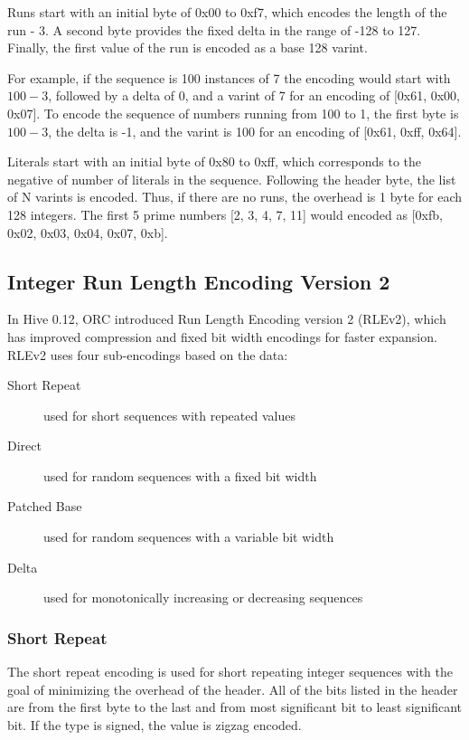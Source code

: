 \documentclass{article}
\begin{document}
Runs start with an initial byte of 0x00 to 0xf7, which encodes the
length of the run - 3. A second byte provides the fixed delta in the
range of -128 to 127. Finally, the first value of the run is encoded
as a base 128 varint.

For example, if the sequence is 100 instances of 7 the encoding would
start with $100 - 3$, followed by a delta of 0, and a varint of 7 for
an encoding of [0x61, 0x00, 0x07]. To encode the sequence of numbers
running from 100 to 1, the first byte is $100 - 3$, the delta is -1,
and the varint is 100 for an encoding of [0x61, 0xff, 0x64].

Literals start with an initial byte of 0x80 to 0xff, which corresponds
to the negative of number of literals in the sequence. Following the
header byte, the list of N varints is encoded.  Thus, if there are
no runs, the overhead is 1 byte for each 128 integers. The first 5
prime numbers [2, 3, 4, 7, 11] would encoded as [0xfb, 0x02, 0x03,
0x04, 0x07, 0xb].

\subsection{Integer Run Length Encoding Version 2}

In Hive 0.12, ORC introduced Run Length Encoding version 2 (RLEv2),
which has improved compression and fixed bit width encodings for
faster expansion. RLEv2 uses four sub-encodings based on the data:

\begin{description}
\item[Short Repeat] used for short sequences with repeated values
\item[Direct] used for random sequences with a fixed bit width
\item[Patched Base] used for random sequences with a variable bit width
\item[Delta] used for monotonically increasing or decreasing sequences
\end{description}

\subsubsection{Short Repeat}

The short repeat encoding is used for short repeating integer
sequences with the goal of minimizing the overhead of the header. All
of the bits listed in the header are from the first byte to the last
and from most significant bit to least significant bit. If the type is
signed, the value is zigzag encoded.
\end{document}
